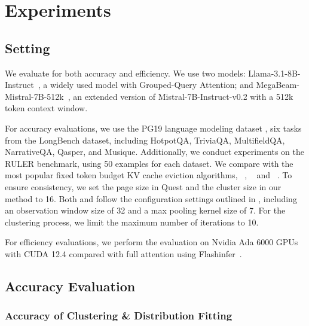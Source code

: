 \section{Experiments}


\subsection{Setting}

We evaluate \sys for both accuracy and efficiency. We use two models: Llama-3.1-8B-Instruct~\cite{grattafiori2024llama3herdmodels}, a widely used model with Grouped-Query Attention; and MegaBeam-Mistral-7B-512k~\cite{megabeam-mistral-7B-512k-2024}, an extended version of Mistral-7B-Instruct-v0.2 with a 512k token context window.

For accuracy evaluations, we use the PG19 language modeling dataset \cite{rae2019compressivetransformerslongrangesequence}, six tasks from the LongBench dataset\cite{bai-etal-2024-longbench}, including HotpotQA\cite{yang-etal-2018-hotpotqa}, TriviaQA\cite{joshi-etal-2017-triviaqa}, MultifieldQA\cite{bai-etal-2024-longbench},  NarrativeQA\cite{kocisky-etal-2018-narrativeqa}, Qasper\cite{dasigi-etal-2021-dataset}, and Musique\cite{bai-etal-2024-longbench}. Additionally, we conduct experiments on the RULER benchmark\cite{hsieh2024rulerwhatsrealcontext}, using 50 examples for each dataset. We compare \sys with the most popular fixed token budget KV cache eviction algorithms, \quest~\cite{tang2024questqueryawaresparsityefficient}, \pyramid~\cite{cai2024pyramidkvdynamickvcache} and \adakv~\cite{feng2024adakvoptimizingkvcache}. To ensure consistency, we set the page size in Quest and the cluster size in our method to 16. Both \adakv and \pyramid follow the configuration
settings outlined in \cite{feng2024adakvoptimizingkvcache}, including an observation window size of 32 and a max pooling kernel size of 7. 
For the clustering process, we limit the maximum number of iterations to 10.

For efficiency evaluations, we perform the evaluation on Nvidia Ada 6000 GPUs with CUDA 12.4 compared with full attention using Flashinfer~\cite{ye2025flashinfer}.

\subsection{Accuracy Evaluation}



\subsubsection{Accuracy of Clustering \& Distribution Fitting}

